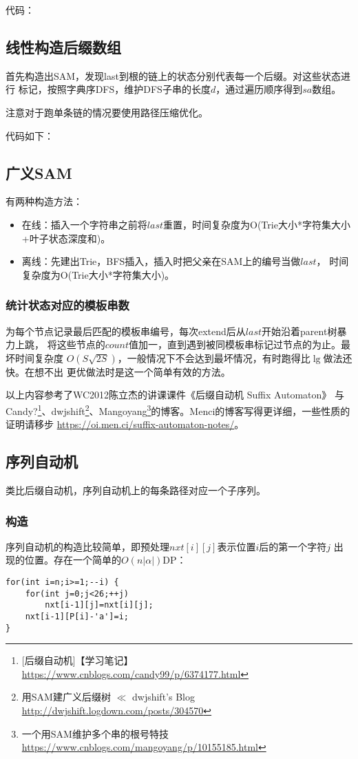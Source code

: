 代码：

\subsection{线性构造后缀数组}
首先构造出SAM，发现last到根的链上的状态分别代表每一个后缀。对这些状态进行
标记，按照字典序DFS，维护DFS子串的长度$d$，通过遍历顺序得到$sa$数组。

注意对于跑单条链的情况要使用路径压缩优化。

代码如下：

\subsection{广义SAM}
有两种构造方法：
\begin{itemize}
    \item 在线：插入一个字符串之前将$last$重置，时间复杂度为O(Trie大小*字符集大小
    +叶子状态深度和)。
    \item 离线：先建出Trie，BFS插入，插入时把父亲在SAM上的编号当做$last$，
    时间复杂度为O(Trie大小*字符集大小)。
\end{itemize}

\subsubsection{统计状态对应的模板串数}
为每个节点记录最后匹配的模板串编号，每次extend后从$last$开始沿着parent树暴力上跳，
将这些节点的$count$值加一，直到遇到被同模板串标记过节点的为止。最坏时间复杂度
$O(S\sqrt{2S})$，一般情况下不会达到最坏情况，有时跑得比$\lg$做法还快。在想不出
更优做法时是这一个简单有效的方法。

以上内容参考了WC2012陈立杰的讲课课件《后缀自动机 Suffix Automaton》
与Candy?\footnote{[后缀自动机]【学习笔记】
    \url{https://www.cnblogs.com/candy99/p/6374177.html}
}、dwjshift\footnote{
    用SAM建广义后缀树 $\ll$ dwjshift's Blog
    \url{http://dwjshift.logdown.com/posts/304570}
}、Mangoyang\footnote{
    一个用SAM维护多个串的根号特技
    \url{https://www.cnblogs.com/mangoyang/p/10155185.html}
}的博客。Menci的博客写得更详细，一些性质的证明请移步
\url{https://oi.men.ci/suffix-automaton-notes/}。

\subsection{序列自动机}
类比后缀自动机，序列自动机上的每条路径对应一个子序列。

\subsubsection{构造}
序列自动机的构造比较简单，即预处理$nxt[i][j]$表示位置$i$后的第一个字符$j$
出现的位置。存在一个简单的$O(n|\alpha|)$DP：
\begin{lstlisting}
for(int i=n;i>=1;--i) {
    for(int j=0;j<26;++j)
        nxt[i-1][j]=nxt[i][j];
    nxt[i-1][P[i]-'a']=i;
}
\end{lstlisting}

